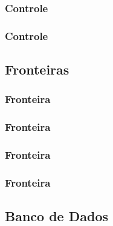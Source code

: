 \subsubsection{Controle}
\subsubsection{Controle}

\subsection{Fronteiras}

\subsubsection{Fronteira}
\subsubsection{Fronteira}
\subsubsection{Fronteira}
\subsubsection{Fronteira}

\subsection{Banco de Dados}